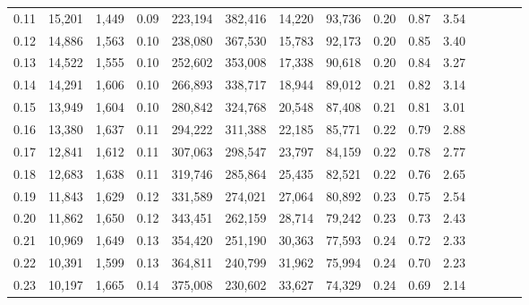 \begin{tabular}{rrrcrrrrrrrrrrr}
0.11 &  15,201 &   1,449 &                                       0.09 &  223,194 &  382,416 &   14,220 &   93,736 &  0.20 &  0.87 &                         3.54 \\
0.12 &  14,886 &   1,563 &                                       0.10 &  238,080 &  367,530 &   15,783 &   92,173 &  0.20 &  0.85 &                         3.40 \\
0.13 &  14,522 &   1,555 &                                       0.10 &  252,602 &  353,008 &   17,338 &   90,618 &  0.20 &  0.84 &                         3.27 \\
0.14 &  14,291 &   1,606 &                                       0.10 &  266,893 &  338,717 &   18,944 &   89,012 &  0.21 &  0.82 &                         3.14 \\
0.15 &  13,949 &   1,604 &                                       0.10 &  280,842 &  324,768 &   20,548 &   87,408 &  0.21 &  0.81 &                         3.01 \\
0.16 &  13,380 &   1,637 &                                       0.11 &  294,222 &  311,388 &   22,185 &   85,771 &  0.22 &  0.79 &                         2.88 \\
0.17 &  12,841 &   1,612 &                                       0.11 &  307,063 &  298,547 &   23,797 &   84,159 &  0.22 &  0.78 &                         2.77 \\
0.18 &  12,683 &   1,638 &                                       0.11 &  319,746 &  285,864 &   25,435 &   82,521 &  0.22 &  0.76 &                         2.65 \\
0.19 &  11,843 &   1,629 &                                       0.12 &  331,589 &  274,021 &   27,064 &   80,892 &  0.23 &  0.75 &                         2.54 \\
0.20 &  11,862 &   1,650 &                                       0.12 &  343,451 &  262,159 &   28,714 &   79,242 &  0.23 &  0.73 &                         2.43 \\
0.21 &  10,969 &   1,649 &                                       0.13 &  354,420 &  251,190 &   30,363 &   77,593 &  0.24 &  0.72 &                         2.33 \\
0.22 &  10,391 &   1,599 &                                       0.13 &  364,811 &  240,799 &   31,962 &   75,994 &  0.24 &  0.70 &                         2.23 \\
0.23 &  10,197 &   1,665 &                                       0.14 &  375,008 &  230,602 &   33,627 &   74,329 &  0.24 &  0.69 &                         2.14 \\

\end{tabular}
